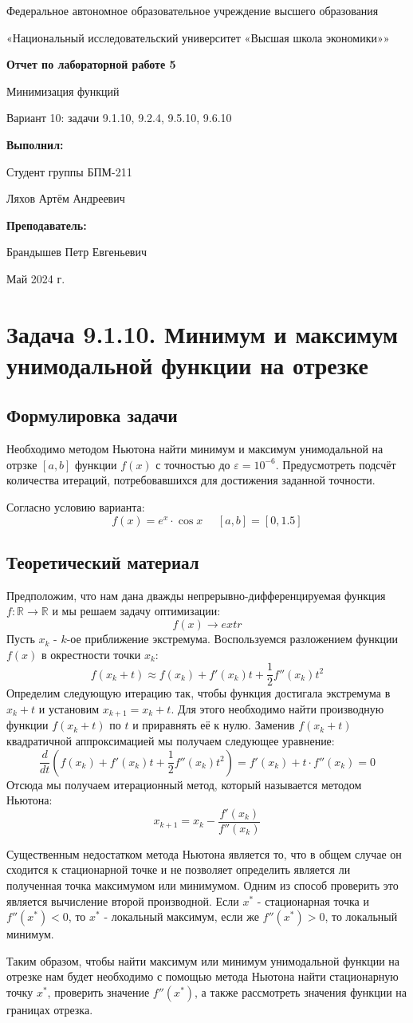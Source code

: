 \documentclass[12pt]{article}%
\date{}{Май 2024 г.}
\newcommand*{\Title}{\begingroup
\centering 

\large {Федеральное автономное образовательное учреждение высшего образования}
\vspace*{\baselineskip}

\large {«Национальный исследовательский университет «Высшая школа экономики»»}
\vspace*{\baselineskip}

\vspace*{\baselineskip}
\large{\textbf{Отчет по лабораторной работе 5}}

\vspace{0.1cm}
\large{Минимизация функций}

\vspace{0.2cm}
\large{Вариант 10: задачи 9.1.10, 9.2.4, 9.5.10, 9.6.10}

\vspace{1.5cm} 

\begin{flushright}
  \textbf{\normalsize Выполнил:}
  
  \vspace{0.3cm} 
  {\normalsize Студент группы БПМ-211}
  
  {\normalsize Ляхов Артём Андреевич}

\end{flushright}


\vspace{0.2cm}  
\begin{flushright}
  \textbf{\normalsize Преподаватель:} 

  \vspace{0.2cm}

 {\normalsize Брандышев Петр Евгеньевич}
 
\end{flushright}

\vfill
\date{}{Май 2024 г.}


\endgroup\clearpage}
\begin{document}
\Title
\tableofcontents

\newpage

\section{Задача 9.1.10. Минимум и максимум унимодальной функции на отрезке}
\subsection{Формулировка задачи}
Необходимо методом Ньютона найти минимум и максимум унимодальной на отрзке $[a, b]$ функции $f(x)$ с точностью до $\varepsilon = 10^{-6}$. Предусмотреть подсчёт количества итераций, потребовавшихся для достижения заданной точности.

Согласно условию варианта:
\[
f(x) = e^x \cdot \cos{x}\ \ \ \ \ \ [a, b] = [0, 1.5]
\]

\subsection{Теоретический материал}
Предположим, что нам дана дважды непрерывно-дифференцируемая функция $f: \mathbb{R} \rightarrow \mathbb{R}$ и мы решаем задачу оптимизации:
\[
f(x) \rightarrow extr
\]
Пусть $x_{k}$ - $k$-ое приближение экстремума. Воспользуемся разложением функции $f(x)$ в окрестности точки $x_{k}$:
\[
f(x_k + t) \approx f(x_k) + f'(x_k)t + \frac{1}{2}f''(x_k)t^2
\]
Определим следующую итерацию так, чтобы функция достигала экстремума в $x_{k} + t$ и установим $x_{k+1} = x_{k} + t$. Для этого необходимо найти производную функции $f(x_k + t)$ по $t$ и приравнять её к нулю. Заменив $f(x_k + t)$ квадратичной аппроксимацией мы получаем следующее уравнение:
\[
\frac{d}{dt}\left(
f(x_k) + f'(x_k)t + \frac{1}{2}f''(x_k)t^2
\right) = 
f'(x_k) + t \cdot f''(x_k) = 0 
\]
Отсюда мы получаем итерационный метод, который называется методом Ньютона:
\begin{equation}
    x_{k + 1} = x_{k} - \frac{f'(x_k)}{f''(x_{k})}
\end{equation}

Существенным недостатком метода Ньютона является то, что в общем случае он сходится к стационарной точке и не позволяет определить является ли полученная точка максимумом или минимумом. Одним из способ проверить это является вычисление второй производной. Если $x^*$ - стационарная точка и $f''(x^*) < 0$, то $x^*$ - локальный максимум, если же $f''(x^*) > 0$, то локальный минимум.

Таким образом, чтобы найти максимум или минимум унимодальной функции на отрезке нам будет необходимо с помощью метода Ньютона найти стационарную точку $x^*$, проверить значение $f''(x^*)$, а также рассмотреть значения функции на границах отрезка.
\end{document}

